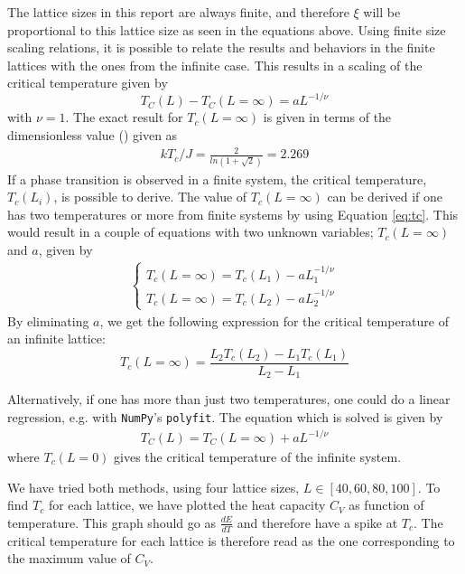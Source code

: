 \documentclass[12pt,english,a4paper]{article}
\begin{document}
\noindent The lattice sizes in this report are always finite, and therefore $\xi$ will be proportional to this lattice size as seen in the equations above. Using finite size scaling relations, it is possible to relate the results and behaviors in the finite lattices with the ones from the infinite case. This results in a scaling of the critical temperature given by
\begin{equation}
    T_C(L)-T_C(L=\infty) = aL^{-1/\nu} \label{eq:tc}
\end{equation}
with $\nu = 1$. The exact result for $T_c(L=\infty)$ is given in terms of the dimensionless value (\cite{LarsOns}) given as
\begin{align*}
    kT_c/J=\frac{2}{ln(1+\sqrt{2})}=2.269
\end{align*}
If a phase transition is observed in a finite system, the critical temperature, $T_{c}(L_i)$, is possible to derive. The value of $T_{c}(L=\infty)$ can be derived if one has two temperatures or more from finite systems by using Equation \eqref{eq:tc}. This would result in a couple of equations with two unknown variables; $T_c(L=\infty)$ and $a$, given by
\begin{align*}
    \begin{cases}
        T_c(L=\infty)=T_c(L_1)-aL_1^{-1/\nu}\\
        T_c(L=\infty)=T_c(L_2)-aL_2^{-1/\nu}
    \end{cases}
\end{align*}
\noindent By eliminating $a$, we get the following expression for the critical temperature of an infinite lattice: 
\begin{equation}
    T_c(L=\infty) = \frac{L_2 T_c(L_2) - L_1 T_c(L_1)}{L_2-L_1}
    \label{eq:Tc_inf}
\end{equation}

Alternatively, if one has more than just two temperatures, one could do a linear regression, e.g. with \texttt{NumPy}'s \texttt{polyfit}. The equation which is solved is given by
\begin{align*}
        T_C(L) = T_C(L=\infty)+aL^{-1/\nu}
\end{align*}
where $T_c(L=0)$ gives the critical temperature of the infinite system. 

We have tried both methods, using four lattice sizes, $L \in [40,60,80,100]$. To find $T_c$ for each lattice, we have plotted the heat capacity $C_V$ as function of temperature. This graph should go as $\frac{dE}{dT}$ and therefore have a spike at $T_c$. The critical temperature for each lattice is therefore read as the one corresponding to the maximum value of $C_V$.
\end{document}
